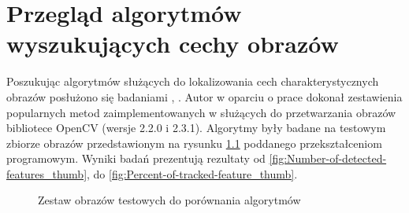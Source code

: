 \chapter{Przegląd algorytmów wyszukujących cechy obrazów}
Poszukując algorytmów służących do lokalizowania cech charakterystycznych obrazów posłużono się badaniami \cite{IK111}, \cite{IK112}. Autor w oparciu o prace \cite{LIFDAS} dokonał zestawienia popularnych metod zaimplementowanych w służących do przetwarzania obrazów bibliotece OpenCV (wersje 2.2.0 i 2.3.1). Algorytmy były badane na testowym zbiorze obrazów przedstawionym na rysunku \ref{fig:zestaw_obrazow_start} poddanego przekształceniom programowym. Wyniki badań prezentują rezultaty od \ref{fig:Number-of-detected-features_thumb}, do \ref{fig:Percent-of-tracked-feature_thumb}.

\begin{figure}[!htb]
\begin{center}

\caption{Zestaw obrazów testowych do porównania algorytmów}
\label{fig:zestaw_obrazow_start}
\end{center}
\end{figure}

